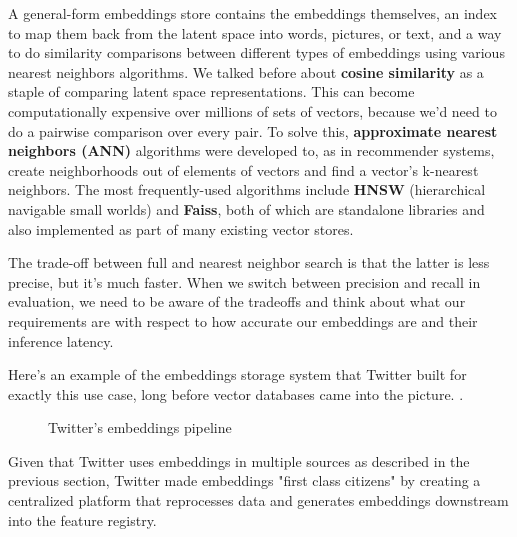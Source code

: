 \documentclass[11pt, table]{diazessay} %
\begin{document}
\begin{sloppypar}
A general-form embeddings store contains the embeddings themselves, an index to map them back from the latent space into words, pictures, or text, and a way to do similarity comparisons between different types of embeddings using various nearest neighbors algorithms. We talked before about \textbf{cosine similarity} as a staple of comparing latent space representations. This can become computationally expensive over millions of sets of vectors, because we'd need to do a pairwise comparison over every pair. To solve this, \textbf{approximate nearest neighbors (ANN)} algorithms were developed to, as in recommender systems, create neighborhoods out of elements of vectors and find a vector's k-nearest neighbors. The most frequently-used algorithms include \textbf{HNSW} (hierarchical navigable small worlds) and \textbf{Faiss}, both of which are standalone libraries and also implemented as part of many existing vector stores.

The trade-off between full and nearest neighbor search is that the latter is less precise, but it's much faster. When we switch between precision and recall in evaluation, we need to be aware of the tradeoffs and think about what our requirements are with respect to how accurate our embeddings are and their inference latency.

Here's an example of the embeddings storage system that Twitter built for exactly this use case, long before vector databases came into the picture.  \citep{shiebler2010making}.

\begin{figure}[H]
\caption{Twitter's embeddings pipeline \citep{shiebler2010making}}
\end{figure}

Given that Twitter uses embeddings in multiple sources as described in the previous section, Twitter made embeddings "first class citizens" by creating a centralized platform that reprocesses data and generates embeddings downstream into the feature registry.


\end{sloppypar}
\end{document}

